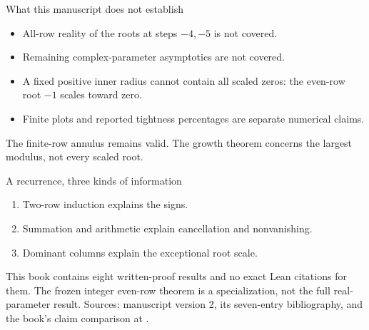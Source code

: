 \documentclass{beamer}
\begin{document}
\begin{frame}{What this manuscript does not establish}
\begin{itemize}
\item All-row reality of the roots at steps $-4,-5$ is not covered.
\item Remaining complex-parameter asymptotics are not covered.
\item A fixed positive inner radius cannot contain all scaled zeros: the even-row root $-1$ scales toward zero.
\item Finite plots and reported tightness percentages are separate numerical claims.
\end{itemize}
\medskip
The finite-row annulus remains valid. The growth theorem concerns the largest modulus, not every scaled root.
\end{frame}
\begin{frame}{A recurrence, three kinds of information}
\begin{enumerate}
\item Two-row induction explains the signs.
\item Summation and arithmetic explain cancellation and nonvanishing.
\item Dominant columns explain the exceptional root scale.
\end{enumerate}
\medskip
This book contains eight written-proof results and no exact Lean citations for them. The frozen integer even-row theorem is a specialization, not the full real-parameter result.
\medskip
Sources: manuscript version 2, its seven-entry bibliography, and the book's claim comparison at \PinnedCommit.
\end{frame}
\appendix
\FormalVerification
\end{document}
